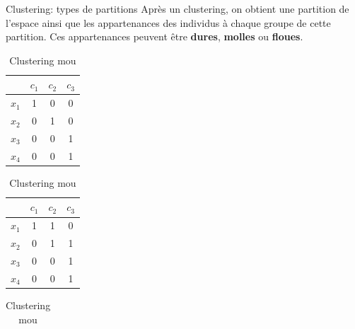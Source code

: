 \documentclass[hyperref={pdfpagelabels=false}]{beamer}
\begin{document}
    \begin{frame}{Clustering: types de partitions}
        Après un clustering, on obtient une partition de l'espace ainsi que les 
        appartenances des individus à chaque groupe de cette partition. Ces 
        appartenances peuvent être \textbf{dures}, \textbf{molles} ou 
        \textbf{floues}.

        \begin{table}[htbp]
            \centering
            \begin{subtable}{.3\textwidth}
                \centering
                \begin{tabular}{|c|c|c|c|}
                    \hline
                          & $c_1$       & $c_2$ & $c_3$ \\
                    \hline
                    \hline
                    $x_1$   & 1    &  0       &  0 \\
                    $x_2$   & 0    &  1       &  0 \\
                    $x_3$   & 0    &  0       &  1 \\
                    $x_4$   & 0    &  0       &  1 \\
                    \hline  
                \end{tabular}
                \caption{Clustering dur}
            \end{subtable}
            \begin{subtable}{.3\textwidth}
                \centering
                \begin{tabular}{|c|c|c|c|}
                    \hline
                          & $c_1$       & $c_2$ & $c_3$ \\
                    \hline
                    \hline
                    $x_1$   & 1    &  1       &  0 \\
                    $x_2$   & 0    &  1       &  1 \\
                    $x_3$   & 0    &  0       &  1 \\
                    $x_4$   & 0    &  0       &  1 \\
                    \hline
                \end{tabular}
                \caption{Clustering mou}
            \end{subtable}
            \begin{subtable}{.3\textwidth}
                \centering
                \begin{tabular}{|c|c|c|c|}
                    \hline

\end{tabular}
\end{subtable}
\end{table}
\end{frame}
\end{document}
